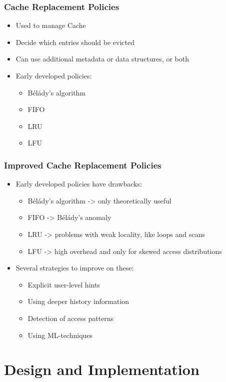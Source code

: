 \documentclass[
	aspectratio=169,
	compress,
]{beamer}
\newcommand{\navframetitle}[1]{\frametitle{#1\hfill{\footnotesize\lastsection{}}}}
\begin{document}
\begin{frame}
	\navframetitle{Cache Replacement Policies}

	\begin{itemize}
		\item Used to manage Cache
		\item Decide which entries should be evicted
		\item Can use additional metadata or data structures, or both
		\item Early developed policies:
		\begin{itemize}
			\item Bélády’s algorithm
			\item FIFO
			\item LRU
			\item LFU
		\end{itemize}
	\end{itemize}
\end{frame}

\begin{frame}
	\navframetitle{Improved Cache Replacement Policies}

	\begin{itemize}
	\item Early developed policies have drawbacks:
	\begin{itemize}
		\item Bélády’s algorithm -> only theoretically useful
		\item FIFO -> Bélády’s anomaly
		\item LRU -> problems with weak locality, like loops and scans
		\item LFU -> high overhead and only for skewed access distributions
	\end{itemize}
	\item Several strategies to improve on these:
	\begin{itemize}
		\item Explicit user-level hints
    	\item Using deeper history information
    	\item Detection of access patterns
    	\item Using ML-techniques
	\end{itemize}
	\end{itemize}
\end{frame}

\section{Design and Implementation}
\label{sec:design}
\end{document}
